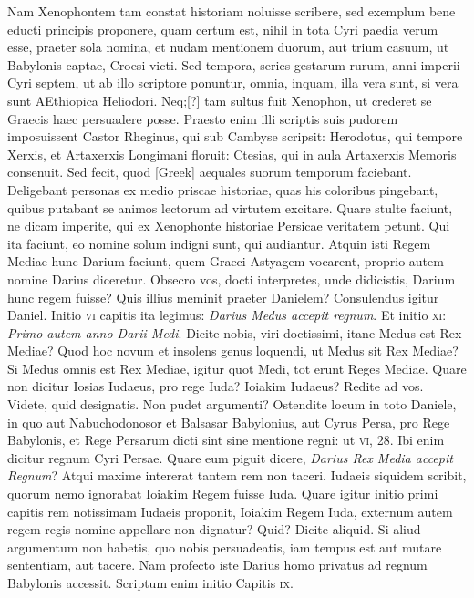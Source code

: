 \begin{parnumbers}
{}
\lnr{}Nam Xenophontem tam constat historiam noluisse scribere, sed exemplum
bene educti principis proponere, quam certum est, nihil in tota Cyri
paedia verum esse, praeter sola nomina, et nudam mentionem duorum,
aut trium casuum, ut Babylonis captae, Croesi victi.
\lnr{}Sed tempora,
series gestarum rurum, anni imperii Cyri septem, ut ab illo
scriptore ponuntur, omnia, inquam, illa vera sunt, si vera sunt AEthiopica
Heliodori.
\lnr{}Neq;[?] tam sultus fuit Xenophon, ut crederet se
Graecis haec persuadere posse.
\lnr{}Praesto enim illi scriptis suis pudorem
imposuissent Castor Rheginus, qui sub Cambyse scripsit: Herodotus,
qui tempore Xerxis, et Artaxerxis Longimani floruit: Ctesias, qui in
aula Artaxerxis Memoris consenuit.
\lnr{}Sed fecit, quod \textgreek{[Greek]} aequales
suorum temporum faciebant.
\lnr{}Deligebant personas ex medio priscae
historiae, quas his coloribus pingebant, quibus putabant se animos
lectorum ad virtutem excitare.
\lnr{}Quare stulte faciunt, ne dicam
imperite, qui ex Xenophonte historiae Persicae veritatem petunt.
\lnr{}Qui ita faciunt, eo nomine solum indigni sunt, qui audiantur.
\lnr{}Atquin isti Regem Mediae hunc Darium faciunt, quem Graeci Astyagem
vocarent, proprio autem nomine Darius diceretur.
\lnr{}Obsecro
vos, docti interpretes, unde didicistis, Darium hunc regem fuisse?
\lnr{}Quis illius meminit praeter Danielem?
\lnr{}Consulendus igitur Daniel.
\lnr{}Initio \textsc{vi} capitis ita legimus:
 \textit{Darius Medus accepit regnum}.
\lnr{}Et initio \textsc{xi}: \textit{Primo autem anno Darii Medi}.
\lnr{}Dicite nobis, viri doctissimi, itane
Medus est Rex Mediae?
\lnr{}Quod hoc novum et insolens genus loquendi,
ut Medus sit Rex Mediae?
\lnr{}Si Medus omnis est Rex Mediae,
igitur quot Medi, tot erunt Reges Mediae.
\lnr{}Quare non dicitur Iosias
Iudaeus, pro rege Iuda?
\lnr{}Ioiakim Iudaeus?
\lnr{}Redite ad vos.
\lnr{}Videte, quid
designatis.
\lnr{}Non pudet argumenti?
\lnr{}Ostendite locum in toto Daniele,
in quo aut Nabuchodonosor et Balsasar Babylonius, aut Cyrus
Persa, pro Rege Babylonis, et Rege Persarum dicti sint sine mentione
regni: ut \textsc{vi}, 28.
\lnr{}Ibi enim dicitur regnum Cyri Persae.
\lnr{}Quare eum piguit dicere, \textit{Darius Rex Media accepit Regnum}?
\lnr{}Atqui maxime intererat
tantem rem non taceri.
\lnr{}Iudaeis siquidem scribit, quorum nemo
ignorabat Ioiakim Regem fuisse Iuda.
\lnr{}Quare igitur initio primi
capitis rem notissimam Iudaeis proponit, Ioiakim Regem Iuda, externum
autem regem regis nomine appellare non dignatur?
\lnr{}Quid?
\lnr{}Dicite aliquid.
\lnr{}Si aliud argumentum non habetis, quo nobis persuadeatis,
iam tempus est aut mutare sententiam, aut tacere.
\lnr{}Nam profecto iste Darius homo privatus ad regnum Babylonis accessit.
\lnr{}Scriptum
enim initio Capitis \textsc{ix}.


\end{parnumbers}
